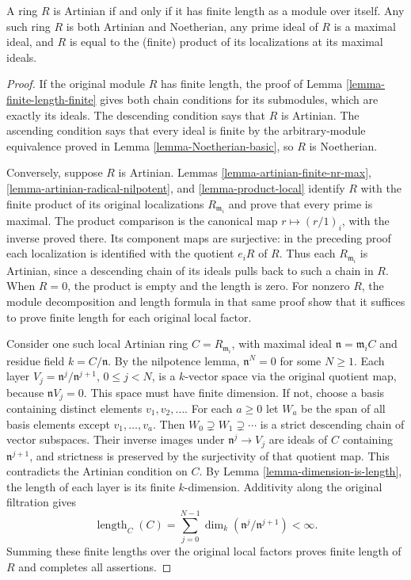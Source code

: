\begin{lemma}
\label{lemma-artinian-finite-length}
A ring $R$ is Artinian if and only if it has finite length
as a module over itself. Any such ring $R$ is both Artinian and
Noetherian, any prime ideal of $R$ is a maximal ideal, and $R$ is equal
to the (finite) product of its localizations at its maximal ideals.
\end{lemma}

\begin{proof}
If the original module $R$ has finite length, the proof of
Lemma \ref{lemma-finite-length-finite} gives both chain conditions
for its submodules, which are exactly its ideals. The descending
condition says that $R$ is Artinian. The ascending condition says
that every ideal is finite by the arbitrary-module equivalence
proved in Lemma \ref{lemma-Noetherian-basic}, so $R$ is Noetherian.

Conversely, suppose $R$ is Artinian. Lemmas
\ref{lemma-artinian-finite-nr-max},
\ref{lemma-artinian-radical-nilpotent}, and
\ref{lemma-product-local} identify $R$ with the finite product
of its original localizations $R_{\mathfrak m_i}$ and prove
that every prime is maximal. The product comparison is the
canonical map $r\mapsto(r/1)_i$, with the inverse proved there.
Its component maps are surjective: in the preceding proof each
localization is identified with the quotient $e_iR$ of $R$.
Thus each $R_{\mathfrak m_i}$ is Artinian, since a descending
chain of its ideals pulls back to such a chain in $R$.
When $R=0$, the product is empty and the length is zero.
For nonzero $R$, the module decomposition and length formula
in that same proof show that it suffices to prove finite length
for each original local factor.

Consider one such local Artinian ring $C=R_{\mathfrak m_i}$,
with maximal ideal $\mathfrak n=\mathfrak m_i C$ and residue
field $k=C/\mathfrak n$. By the nilpotence lemma,
$\mathfrak n^N=0$ for some $N\geq1$.
Each layer $V_j=\mathfrak n^j/\mathfrak n^{j+1}$,
$0\leq j<N$, is a $k$-vector space via the original quotient
map, because $\mathfrak n V_j=0$.
This space must have finite dimension. If not, choose a basis
containing distinct elements $v_1,v_2,\ldots$.
For each $a\geq0$ let $W_a$ be the span of all basis elements
except $v_1,\ldots,v_a$. Then
$W_0\supsetneq W_1\supsetneq\cdots$ is a strict descending
chain of vector subspaces. Their inverse images under
$\mathfrak n^j\to V_j$ are ideals of $C$ containing
$\mathfrak n^{j+1}$, and strictness is preserved by the
surjectivity of that quotient map. This contradicts the
Artinian condition on $C$.
By Lemma \ref{lemma-dimension-is-length}, the length of each
layer is its finite $k$-dimension. Additivity along the original
filtration gives
$$
\operatorname{length}_C(C)
=\sum_{j=0}^{N-1}\dim_k(\mathfrak n^j/\mathfrak n^{j+1})<\infty.
$$
Summing these finite lengths over the original local factors
proves finite length of $R$ and completes all assertions.


\end{proof}
